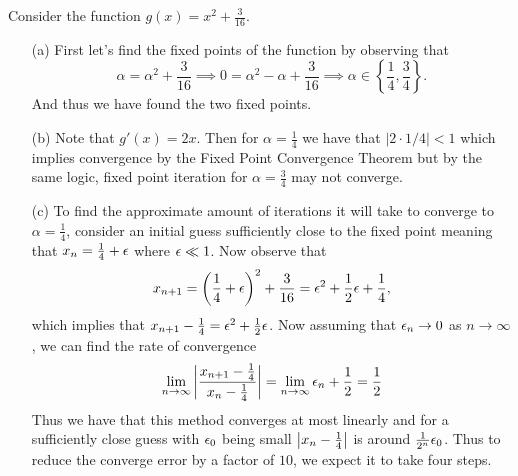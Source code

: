 \documentclass[12pt]{report}
\begin{document}
\begin{solution}

    \noindent
    Consider the function $g(x) = x^2 + \frac{3}{16}$. 
    \begin{enumerate}
        \item [(a)]
        First let's find the fixed points of the function by observing that
        \[ 
            \alpha = \alpha^2 + \frac{3}{16} \implies 0 = \alpha^2 - \alpha + \frac{3}{16} \implies \alpha \in \left\{ \frac{1}{4}, \frac{3}{4}\right\}.
        \]     
        And thus we have found the two fixed points.
        
        \item [(b)]
        Note that $g'(x) = 2x$. Then for $\alpha = \frac{1}{4}$ we have that $|2 \cdot 1/4| < 1$ which implies convergence by the Fixed Point Convergence Theorem but by the same logic, fixed point iteration for $\alpha = \frac{3}{4}$ may not converge.
        
        
        \item [(c)]
        To find the approximate amount of iterations it will take to converge to $\alpha = \frac{1}{4}$, consider an initial guess sufficiently close to the fixed point meaning that $x_n = \frac{1}{4} + {\epsilon}$ where ${\epsilon} \ll 1$. Now observe that
        \[ 
            x_{n+1} = {\left(\frac{1}{4} + {\epsilon}\right)}^2 + \frac{3}{16} = {\epsilon}^2 + \frac{1}{2}{\epsilon} + \frac{1}{4}, 
        \]
        which implies that $x_{n+1} - \frac{1}{4} = {\epsilon}^2 + \frac{1}{2}{\epsilon}$. Now assuming that ${\epsilon}_n \to 0$ as $n \to \infty$, we can find the rate of convergence 
        \[ 
            \lim_{n \to \infty} {\left|\frac{x_{n+1} - \frac{1}{4}}{x_{n} - \frac{1}{4}}\right|} = \lim_{n \to \infty} {\epsilon}_n + \frac{1}{2} = \frac{1}{2}
        \]
        Thus we have that this method converges at most linearly and for a sufficiently close guess with ${\epsilon}_0$ being small $ {\left|x_n - \frac{1}{4}\right|}$ is around  $\frac{1}{2^n} {\epsilon}_0$. Thus to reduce the converge error by a factor of $10$, we expect it to take four steps.



    \end{enumerate}
\end{solution}

\newpage


\end{document}
